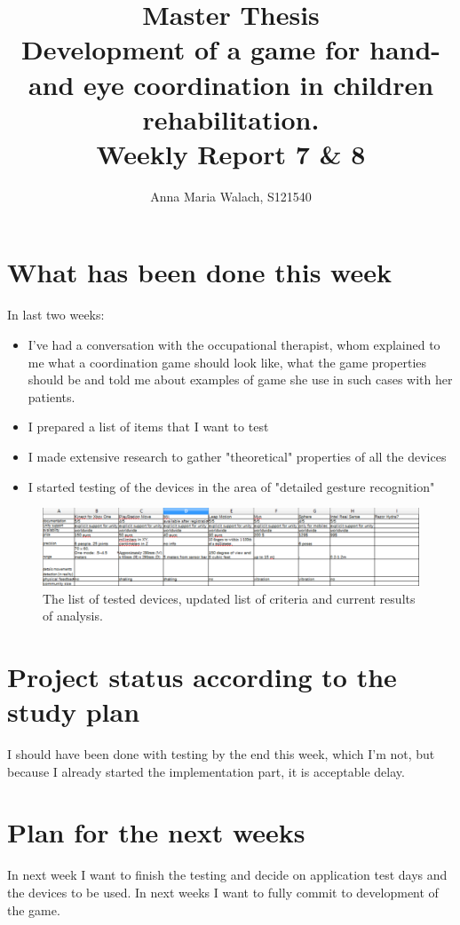 \documentclass[10pt,a4paper]{article}
\title{{Master Thesis\\[0.5em]}
       {\bf \huge Development of a game for hand- and eye coordination in children rehabilitation.\\[0.5em]}
       {\bf Weekly Report 7 \& 8}}
\author{Anna Maria Walach, S121540}
\begin{document}
\maketitle

\section*{What has been done this week}
In last two weeks:
\begin{itemize}
\item I've had a conversation with the occupational therapist, whom explained to me what a coordination game should look like, what the game properties should be and told me about examples of game she use in such cases with her patients. 
\item I prepared a list of items that I want to test
\item I made extensive research to gather "theoretical" properties of all the devices
\item I started testing of the devices in the area of "detailed gesture recognition"
\end{itemize}
\begin{figure}
\centering
\includegraphics[scale=0.4]{comparison.png} 
\caption{The list of tested devices, updated list of criteria and current results of analysis.}
\end{figure}

\section*{Project status according to the study plan}
I should have been done with testing by the end this week, which I'm not, but because I already started the implementation part, it is acceptable delay. 

\section*{Plan for the next weeks}
In next week I want to finish the testing and decide on application test days and the devices to be used. 
In next weeks I want to fully commit to development of the game. 

\end{document}

